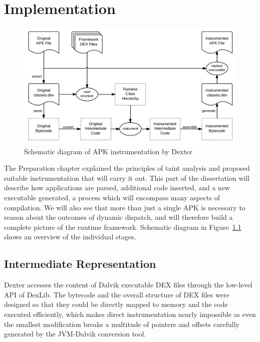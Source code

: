\documentclass[12pt,twoside,notitlepage]{report}
\begin{document}
\cleardoublepage
\chapter{Implementation}

\begin{figure}
	\centerline{	
		\includegraphics[width=\textwidth]{figs/fig_implementation_overview.png}
	}
	\caption{Schematic diagram of APK instrumentation by Dexter}
	\label{fig:Implementation_Overview}
\end{figure}

The Preparation chapter explained the principles of taint analysis and proposed suitable instrumentation that will carry it out. This part of the dissertation will describe how applications are parsed, additional code inserted, and a new executable generated, a process which will encompass many aspects of compilation. We will also see that more than just a single APK is necessary to reason about the outcomes of dynamic dispatch, and will therefore build a complete picture of the runtime framework. Schematic diagram in Figure~\ref{fig:Implementation_Overview} shows an overview of the individual stages.

\section{Intermediate Representation}

Dexter accesses the content of Dalvik executable DEX files through the low-level API of DexLib. The bytecode and the overall structure of DEX files were designed so that they could be directly mapped to memory and the code executed efficiently, which makes direct instrumentation nearly impossible as even the smallest modification breaks a multitude of pointers and offsets carefully generated by the JVM-Dalvik conversion tool.
\end{document}

